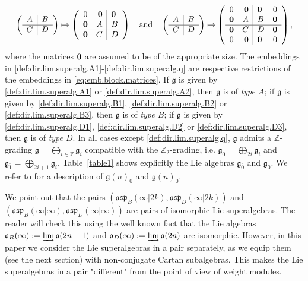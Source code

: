 \documentclass[12pt]{amsart}
\newcommand\Z{\mathbb{Z}}
\newcommand\g{\mathfrak{g}}
\newcommand\fosp{\mathfrak{osp}}
\newcommand\fo{\mathfrak{o}}
\theoremstyle{plain}
\theoremstyle{definition}
\numberwithin{equation}{section}
\begin{document}
\begin{equation}\label{eq:emb.block.matrices}
\left(\begin{array}{c|c}
    A & B  \\
\hline
    C & D
  \end{array}\right) \mapsto
\left(\begin{array}{cr|l}
	0 & {\bf 0} & {\bf 0} \\
    {\bf 0} & A & B  \\
\hline
    {\bf 0} &  C & D
  \end{array}\right)\quad\text{and}\quad \left(\begin{array}{c|c}
    A & B  \\
\hline
    C & D
  \end{array}\right) \mapsto
\left(\begin{array}{cr|lc}
	0 & {\bf 0} & {\bf 0} &0 \\
    {\bf 0} & A & B & {\bf 0} \\
\hline
    {\bf 0} &  C & D & {\bf 0}\\
    0 & {\bf 0} & {\bf 0} & 0
  \end{array}\right),
\end{equation}
where the matrices ${\bf 0}$ are assumed to be of the appropriate size. The embeddings in \eqref{def:dir.lim.superalg.A1}-\eqref{def:dir.lim.superalg.q} are respective restrictions of the embeddings in  \eqref{eq:emb.block.matrices}.  If $\g$ is given by \eqref{def:dir.lim.superalg.A1} or \eqref{def:dir.lim.superalg.A2}, then $\g$ is of \emph{type $A$}; if $\g$ is given by \eqref{def:dir.lim.superalg.B1}, \eqref{def:dir.lim.superalg.B2} or \eqref{def:dir.lim.superalg.B3}, then $\g$ is of \emph{type $B$}; if $\g$ is given by  \eqref{def:dir.lim.superalg.D1}, \eqref{def:dir.lim.superalg.D2} or \eqref{def:dir.lim.superalg.D3}, then $\g$ is of \emph{type $D$}. In all cases except \eqref{def:dir.lim.superalg.q}, $\g$ admits a $\Z$-grading $\g = \bigoplus_{i\in \Z}\g_i$ compatible with the $\Z_2$-grading, i.e. $\g_{\bar 0} = \bigoplus_{2i}\g_i$ and $\g_{\bar 1} = \bigoplus_{2i+1}\g_i$. Table~\ref{table1} shows explicitly the Lie algebras $\g_{\bar 0}$ and $\g_0$. We refer to \cite[Tables on Lie superalgebras, page 342]{FSS00} for a description of $\g(n)_{\bar 0}$ and $\g(n)_0$.

We point out that the pairs $(\fosp_B(\infty|2k), \fosp_D(\infty|2k))$ and $(\fosp_B(\infty|\infty), \fosp_D(\infty|\infty))$ are pairs of isomorphic Lie superalgebras. The reader will check this using the well known fact that the Lie algebras $\fo_B(\infty) := \varinjlim \fo(2n+1)$ and $\fo_D(\infty) := \varinjlim \fo(2n)$ are isomorphic. However, in this paper we consider the Lie superalgebras in a pair separately, as we equip them (see the next section) with non-conjugate Cartan subalgebras. This makes the Lie superalgebras in a pair "different" from the point of view of weight modules.
\end{document}
